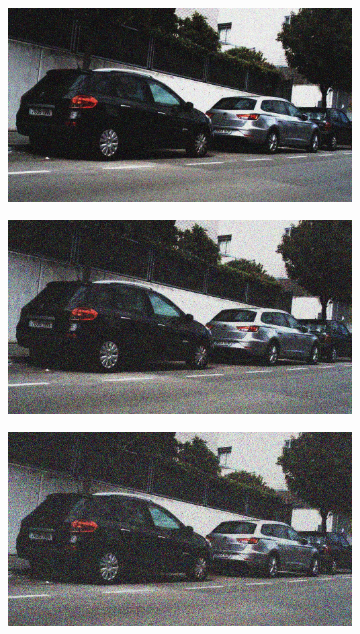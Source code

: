 \documentclass[a4paper]{ctexart}
\begin{document}
\begin{figure}[htbp]
\begin{subfigure}{0.08\textwidth}
				\label{fig：Gamma=0.3, Gauss Noise = 0.1}
			\end{subfigure}
			\begin{subfigure}{0.08\textwidth}
				\captionsetup{font=scriptsize}
				\includegraphics[width=\linewidth]{picture/Edge Detection/degrade/RGB_001 Gamma=0.3, Gauss Noise=0.2}
				\label{fig：Gamma=0.3, Gauss Noise = 0.2}
			\end{subfigure}
			\begin{subfigure}{0.08\textwidth}
				\captionsetup{font=scriptsize}
				\includegraphics[width=\linewidth]{picture/Edge Detection/degrade/RGB_001 Gamma=0.3, Gauss Noise=0.3}
				\label{fig：Gamma=0.3, Gauss Noise = 0.3}
			\end{subfigure}
			\begin{subfigure}{0.08\textwidth}
				\captionsetup{font=scriptsize}
				\includegraphics[width=\linewidth]{picture/Edge Detection/degrade/RGB_001 Gamma=0.3, Gauss Noise=0.4}

\end{subfigure}
\end{figure}
\end{document}
